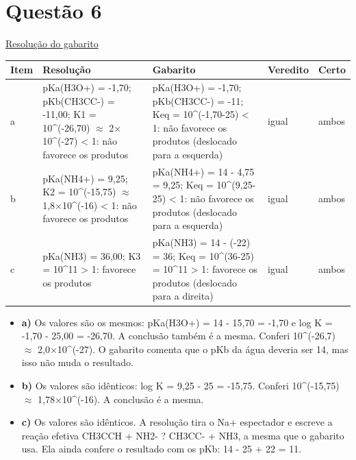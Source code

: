 \documentclass{article}%
\begin{document}
\section*{Questão 6}%
\href{https://poliedroresolve.sistemapoliedro.com.br/vestibulares/ita/2026/ita-2-fase-dia-2-29-10-2025-2-fase-dia-2/dissertativa-6-quimica-2-fase-dia-2-ita-2026}{Resolução do gabarito}\par\smallskip%
\begin{longtable}{@{}p{} p{} p{} p{} p{}@{}}\toprule Item & Resolução & Gabarito & Veredito & Certo \\ \midrule
a & pKa(H3O+) = -1,70; pKb(CH3CC-) = -11,00; K1 = 10\^{}(-26,70) $\approx$ 2$\times$10\^{}(-27) < 1: não favorece os produtos & pKa(H3O+) = -1,70; pKb(CH3CC-) = -11; Keq = 10\^{}(-1,70-25) < 1: não favorece os produtos (deslocado para a esquerda) & igual & ambos \\
b & pKa(NH4+) = 9,25; K2 = 10\^{}(-15,75) $\approx$ 1,8$\times$10\^{}(-16) < 1: não favorece os produtos & pKa(NH4+) = 14 - 4,75 = 9,25; Keq = 10\^{}(9,25-25) < 1: não favorece os produtos (deslocado para a esquerda) & igual & ambos \\
c & pKa(NH3) = 36,00; K3 = 10\^{}11 > 1: favorece os produtos & pKa(NH3) = 14 - (-22) = 36; Keq = 10\^{}(36-25) = 10\^{}11 > 1: favorece os produtos (deslocado para a direita) & igual & ambos \\
\bottomrule\end{longtable}%
\begin{itemize}%
\item%
\textbf{a)} Os valores são os mesmos: pKa(H3O+) = 14 - 15,70 = -1,70 e log K = -1,70 - 25,00 = -26,70. A conclusão também é a mesma. Conferi 10\^{}(-26,7) $\approx$ 2,0$\times$10\^{}(-27). O gabarito comenta que o pKb da água deveria ser 14, mas isso não muda o resultado.%
\item%
\textbf{b)} Os valores são idênticos: log K = 9,25 - 25 = -15,75. Conferi 10\^{}(-15,75) $\approx$ 1,78$\times$10\^{}(-16). A conclusão é a mesma.%
\item%
\textbf{c)} Os valores são idênticos. A resolução tira o Na+ espectador e escreve a reação efetiva CH3CCH + NH2- ? CH3CC- + NH3, a mesma que o gabarito usa. Ela ainda confere o resultado com os pKb: 14 - 25 + 22 = 11.%
\end{itemize}%
\end{document}
